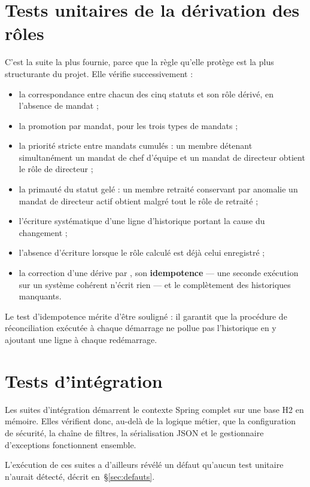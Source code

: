 \section{Tests unitaires de la dérivation des rôles}

C'est la suite la plus fournie, parce que la règle qu'elle protège est la plus structurante
du projet. Elle vérifie successivement :

\begin{itemize}
  \item la correspondance entre chacun des cinq statuts et son rôle dérivé, en l'absence de
        mandat ;
  \item la promotion par mandat, pour les trois types de mandats ;
  \item la priorité stricte entre mandats cumulés : un membre détenant simultanément un
        mandat de chef d'équipe et un mandat de directeur obtient le rôle de directeur ;
  \item la primauté du statut gelé : un membre retraité conservant par anomalie un mandat
        de directeur actif obtient malgré tout le rôle de retraité ;
  \item l'écriture systématique d'une ligne d'historique portant la cause du changement ;
  \item l'absence d'écriture lorsque le rôle calculé est déjà celui enregistré ;
  \item la correction d'une dérive par , son \textbf{idempotence}
        --- une seconde exécution sur un système cohérent n'écrit rien --- et le
        complètement des historiques manquants.
\end{itemize}

Le test d'idempotence mérite d'être souligné : il garantit que la procédure de
réconciliation exécutée à chaque démarrage ne pollue pas l'historique en y ajoutant une
ligne à chaque redémarrage.

\section{Tests d'intégration}

Les suites d'intégration démarrent le contexte Spring complet sur une base H2 en mémoire. Elles vérifient donc, au-delà
de la logique métier, que la configuration de sécurité, la chaîne de filtres, la
sérialisation JSON et le gestionnaire d'exceptions fonctionnent ensemble.

L'exécution de ces suites a d'ailleurs révélé un défaut qu'aucun test unitaire n'aurait
détecté, décrit en~§\ref{sec:defauts}.

